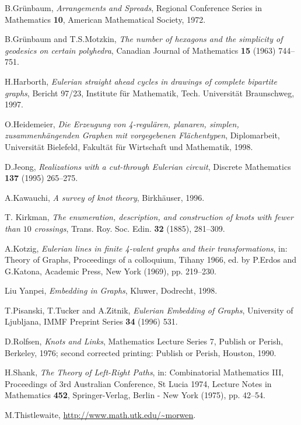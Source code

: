 \documentclass[12pt]{article}
\begin{document}
\begin{thebibliography}{99}
B.Gr\"{u}nbaum, {\em Arrangements and Spreads}, Regional Conference Series in
Mathematics {\bf 10}, American Mathematical Society, 1972.


B.Gr\"{u}nbaum and T.S.Motzkin, {\em The number of hexagons and the simplicity
of geodesics on certain polyhedra}, Canadian Journal of Mathematics {\bf 15} (1963) 744--751.


H.Harborth, {\em Eulerian straight ahead cycles in drawings of complete
bipartite graphs}, Bericht 97/23, Institute f\"{u}r Mathematik, Tech. 
Universit\"{a}t
Braunschweg, 1997.


O.Heidemeier, {\em Die Erzeugung von 4-regul\"{a}ren, planaren,
simplen, zusammenh\"{a}ngenden Graphen mit vorgegebenen Fl\"{a}chentypen},
Diplomarbeit, Universit\"{a}t Bielefeld, Fakult\"{a}t f\"{u}r Wirtschaft und
Mathematik, 1998. 


D.Jeong, {\em Realizations with a cut-through Eulerian circuit},
Discrete Mathematics {\bf 137} (1995) 265--275.




A.Kawauchi, {\em A survey of knot theory}, Birkh\"{a}user, 1996.


T. Kirkman, {\em The enumeration, description, and construction of knots with fewer than $10$ crossings}, Trans. Roy. Soc. Edin. {\bf 32} (1885), 281--309.


A.Kotzig, {\em Eulerian lines in finite 4-valent graphs and their 
transformations}, in: Theory of Graphs, Proceedings of a colloquium, 
Tihany 1966, ed. by P.Erdos and G.Katona, Academic Press, 
New York (1969), pp. 219--230.


Liu Yanpei, {\em Embedding in Graphs}, Kluwer, Dodrecht, 1998.


T.Pisanski, T.Tucker and A.Zitnik, {\em Eulerian Embedding of Graphs},
University of Ljubljana, IMMF Preprint Series {\bf 34}
(1996) 531.


D.Rolfsen, {\em Knots and Links}, Mathematics Lecture Series 7, Publish or
Perish, Berkeley, 1976;
second corrected printing: Publish or Perish, Houston, 1990.


H.Shank, {\em The Theory of Left-Right Paths}, in: Combinatorial 
Mathematics III,
Proceedings of 3rd Australian Conference, St Lucia 1974, Lecture Notes in
Mathematics {\bf 452}, Springer-Verlag, Berlin - New York (1975),  pp. 42--54.


M.Thistlewaite, \url{http://www.math.utk.edu/~morwen}.


\end{thebibliography}
\end{document}
